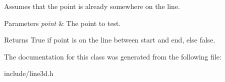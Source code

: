 Assumes that the point is already somewhere on the line. 
\begin{DoxyParams}{Parameters}
{\em point} & The point to test. \\
\hline
\end{DoxyParams}
\begin{DoxyReturn}{Returns}
True if point is on the line between start and end, else false. 
\end{DoxyReturn}


The documentation for this class was generated from the following file\+:\begin{DoxyCompactItemize}
\item 
include/line3d.\+h\end{DoxyCompactItemize}
